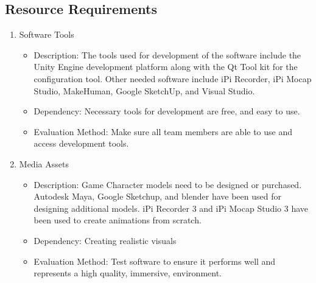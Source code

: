 \documentclass[a4paper,10pt]{article}
\begin{document}
	\subsection{Resource Requirements}
	\begin{enumerate}
	\item Software Tools
	\begin{itemize}
	\item Description: The tools used for development of the software include the Unity Engine development platform along with the Qt Tool kit for the configuration tool. Other needed software include iPi Recorder, iPi Mocap Studio, MakeHuman, Google SketchUp, and Visual Studio.
	\item  Dependency: Necessary tools for development are free, and easy to use. 
	\item Evaluation Method: Make sure all team members are able to use and access development tools.
	  \end{itemize}
	\item Media Assets
	\begin{itemize}
	  \item Description: Game Character models need to be designed or purchased. Autodesk Maya, Google Sketchup, and blender have been used for designing additional models. iPi Recorder 3 and iPi Mocap Studio 3 have been used to create animations from scratch. 
	  \item Dependency: Creating realistic visuals 
	  \item Evaluation Method: Test software to ensure it performs well and represents a high quality, immersive, environment.
	\end{itemize}
	\end{enumerate}
\end{document}
